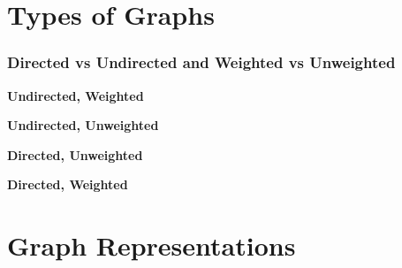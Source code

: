 \documentclass{beamer}
\begin{document}
\section{Types of Graphs}
\begin{frame}[fragile]
	\frametitle{Directed vs Undirected and Weighted vs Unweighted}
	\begin{minipage}{0.49\textwidth}
		\centering
		
		\textbf{Undirected, Weighted}
	\end{minipage}
	\hfill
	\begin{minipage}{0.49\textwidth}
		\centering
		
		\textbf{Undirected, Unweighted}
	\end{minipage}
	\vfill
	\begin{minipage}{0.49\textwidth}
		\centering
		
		\textbf{Directed, Unweighted}
	\end{minipage}
	\hfill
	\begin{minipage}{0.49\textwidth}
		\centering
		
		\textbf{Directed, Weighted}
	\end{minipage}
\end{frame}

\section{Graph Representations}
\end{document}
